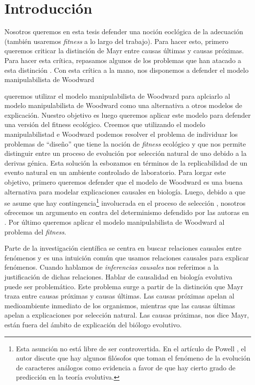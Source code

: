 
\chapter*{Introducción}


\noindent Nosotros queremos en esta tesis defender una noción eoclógica de la adecuación (también usaremos \emph{fitness } a lo largo del trabajo). Para hacer esto, primero queremos criticar la distinción de Mayr entre causas últimas y causas próximas. Para hacer esta crítica, repasamos algunos de los problemas que han atacado a esta distinción \cite{Laland2011, Uller2019}. Con esta crítica a la mano, nos disponemos a defender el modelo manipulabilista de Woodward \cite{Woodward2000, Woodward2003}

queremos utilizar el modelo manipulabilista de Woodward para aplciarlo  al modelo manipulabilista de Woodward como una alternativa a otros modelos de explicación. Nuestro objetivo es  luego queremos aplicar este modelo para defender una versión del fitness ecológico. Creemos que utilizando el modelo manipulabilistad e Woodward podemos resolver el problema de individuar los problemas de ``diseño''  que tiene la noción de \emph{fitness} ecológico \cite{Bouchard2004, sep-fitness} y que nos permite distinguir entre un proceso de evolución por selección natural de uno debido a la derivas génica. Esta solución la esbozamos en términos de la replicabilidad de un evento natural en un ambiente controlado de laboratorio. Para lorgar este objetivo, primero queremos defender que el modelo de Woodward es una buena alternativa para modelar explicaciones causales en biología. Luego, debido a que se asume que hay contingencia\footnote{Esta asunción no está libre de ser controvertida. En el artículo de Powell \citeyear{Powell2012}, el autor discute que hay algunos filósofos que toman el fenómeno de la evolución de caracteres análogos como evidencia a favor de que hay cierto grado de predicción en la teoría evolutiva.} involucrada en el proceso de selección \cite{Scriven1959, Mayr1998}, nosotros ofrecemos un argumento en contra del determinismo defendido por las autoras en \cite{Graves1999}. Por último queremos aplicar el modelo manipulabilista de Woodward al problema del \emph{fitness}.

Parte de la investigación científica se centra en buscar relaciones causales entre fenómenos y es una intuición común que usamos relaciones causales para explicar fenómenos. Cuando hablamos de \textit{inferencias causales} nos referimos a la justificación de dichas relaciones. Hablar de causalidad en biología evolutiva puede ser problemático. Este problema surge a partir de la distinción que Mayr \cite{Mayr1998} traza entre causas próximas y causas últimas. Las causas próximas apelan al medioambiente inmediato de los organismos, mientras que las causas últimas apelan a explicaciones por selección natural. Las causas próximas, nos dice Mayr, están fuera del ámbito de explicación del biólogo evolutivo.

